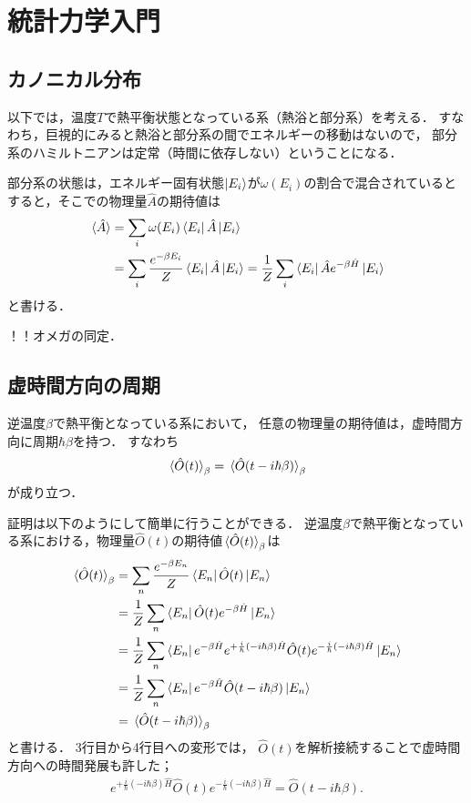 \documentclass[uplatex,dvipdfmx]{vkaishi}
\begin{document}
\section{統計力学入門}

\subsection{カノニカル分布}

以下では，温度$T$で熱平衡状態となっている系（熱浴と部分系）を考える．
すなわち，巨視的にみると熱浴と部分系の間でエネルギーの移動はないので，
部分系のハミルトニアンは定常（時間に依存しない）ということになる．

部分系の状態は，エネルギー固有状態$\ket{E_i}$が$\omega(E_i)$の割合で混合されているとすると，そこでの物理量$\hat A$の期待値は
\begin{align}
  \expval*{\hat A}
  &= \sum_i \omega(E_i) \bra{E_i} \hat A \ket{E_i} \\
  &= \sum_i \frac{e^{-\beta E_i}}{Z} \bra{E_i} \hat A \ket{E_i}
  = \frac1Z \sum_i \bra{E_i} \hat A e^{-\beta \hat H} \ket{E_i}
\end{align}
と書ける．

！！オメガの同定．

\subsection{虚時間方向の周期}

逆温度$\beta$で熱平衡となっている系において，
任意の物理量の期待値は，虚時間方向に周期$\hbar\beta$を持つ．
すなわち
\begin{align}
  \expval*{\hat O(t)}_\beta
  = \expval*{\hat O(t - i\hbar\beta)}_\beta
  \label{eq:O-period}
\end{align}
が成り立つ．

証明は以下のようにして簡単に行うことができる．
逆温度$\beta$で熱平衡となっている系における，物理量$\hat O(t)$の期待値$\expval*{\hat O(t)}_\beta$は
\begin{align*}
  \expval*{\hat O(t)}_\beta
  &= \sum_n \frac{e^{-\beta E_n}}{Z} \bra{E_n} \hat O(t) \ket{E_n} \\
  &= \frac1Z \sum_n \bra{E_n} \hat O(t) e^{-\beta \hat H} \ket{E_n} \\
  &= \frac1Z \sum_n \bra{E_n} e^{-\beta \hat H} e^{+\frac{i}{\hbar}(-i\hbar\beta) \hat H} \hat O(t) e^{-\frac{i}{\hbar}(-i\hbar\beta) \hat H} \ket{E_n} \\
  &= \frac1Z \sum_n \bra{E_n} e^{-\beta \hat H} \hat O(t - i\hbar\beta) \ket{E_n} \\
    &= \expval*{\hat O(t - i\hbar\beta)}_\beta
\end{align*}
と書ける．
3行目から4行目への変形では，
$\hat O(t)$を解析接続することで虚時間方向への時間発展も許した；
\begin{align}
  e^{+\frac{i}{\hbar}(-i\hbar\beta) \hat H} \hat O(t) e^{-\frac{i}{\hbar}(-i\hbar\beta) \hat H}
  = \hat O(t - i\hbar\beta).
\end{align}
\QED
\end{document}
